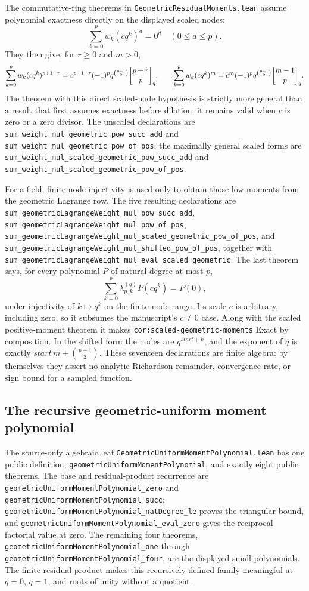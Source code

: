 \documentclass[11pt,oneside]{article}
\theoremstyle{definition}
\theoremstyle{remark}
\begin{document}
The commutative-ring theorems in
\nolinkurl{GeometricResidualMoments.lean} assume polynomial exactness directly
on the displayed scaled nodes:
\[
  \sum_{k=0}^{p}w_k(cq^k)^d=0^d\quad(0\leq d\leq p).
\]
They then give, for \(r\geq0\) and \(m>0\),
\[
 \sum_{k=0}^{p}w_k(cq^k)^{p+1+r}
 =c^{p+1+r}(-1)^p q^{\binom{p+1}{2}}\GaussianBinomial{p+r}{p}{q},
 \qquad
 \sum_{k=0}^{p}w_k(cq^k)^m
 =c^m(-1)^p q^{\binom{p+1}{2}}\GaussianBinomial{m-1}{p}{q}.
\]
The theorem with this direct scaled-node hypothesis is strictly more general
than a result that first assumes exactness before dilation: it remains valid
when \(c\) is zero or a zero divisor.  The unscaled declarations are
\nolinkurl{sum_weight_mul_geometric_pow_succ_add} and
\nolinkurl{sum_weight_mul_geometric_pow_of_pos}; the maximally general scaled
forms are
\nolinkurl{sum_weight_mul_scaled_geometric_pow_succ_add} and
\nolinkurl{sum_weight_mul_scaled_geometric_pow_of_pos}.

For a field, finite-node injectivity is used only to obtain those low moments
from the geometric Lagrange row.  The five resulting declarations are
\nolinkurl{sum_geometricLagrangeWeight_mul_pow_succ_add},
\nolinkurl{sum_geometricLagrangeWeight_mul_pow_of_pos},
\nolinkurl{sum_geometricLagrangeWeight_mul_scaled_geometric_pow_of_pos}, and
\nolinkurl{sum_geometricLagrangeWeight_mul_shifted_pow_of_pos}, together with
\nolinkurl{sum_geometricLagrangeWeight_mul_eval_scaled_geometric}.  The last
theorem says, for every polynomial \(P\) of natural degree at most \(p\),
\[
 \sum_{k=0}^{p}\lambda_{p,k}^{(q)}P(cq^k)=P(0),
\]
under injectivity of \(k\mapsto q^k\) on the finite node range.  Its scale
\(c\) is arbitrary, including zero, so it subsumes the manuscript's
\(c\ne0\) case.  Along with the scaled positive-moment theorem it makes
\nolinkurl{cor:scaled-geometric-moments} Exact by composition.  In the shifted
form the nodes are \(q^{start+k}\), and the exponent of \(q\) is exactly
\(start\,m+\binom{p+1}{2}\).  These seventeen declarations are finite algebra:
by themselves they assert no analytic Richardson remainder, convergence rate,
or sign bound for a sampled function.

\subsection{The recursive geometric-uniform moment polynomial}
The source-only algebraic leaf
\nolinkurl{GeometricUniformMomentPolynomial.lean} has one public definition,
\nolinkurl{geometricUniformMomentPolynomial}, and exactly eight public
theorems.  The base and residual-product recurrence are
\nolinkurl{geometricUniformMomentPolynomial_zero} and
\nolinkurl{geometricUniformMomentPolynomial_succ};
\nolinkurl{geometricUniformMomentPolynomial_natDegree_le} proves the
triangular bound, and
\nolinkurl{geometricUniformMomentPolynomial_eval_zero} gives the reciprocal
factorial value at zero.  The remaining four theorems,
\nolinkurl{geometricUniformMomentPolynomial_one} through
\nolinkurl{geometricUniformMomentPolynomial_four}, are the displayed small
polynomials.  The finite residual product makes this recursively defined
family meaningful at \(q=0\), \(q=1\), and roots of unity without a quotient.
\end{document}
